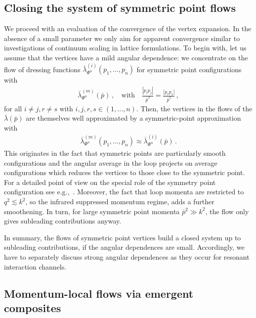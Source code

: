 \documentclass[aps,twocolumn,prd,superscriptaddress]{revtex4-2}
\begin{document}
\subsection{Closing the system of symmetric point flows} 
\label{sec:SymPointflows}
 
We proceed with an evaluation of the convergence of the vertex expansion. In the absence of a small parameter we only aim for apparent convergence similar to investigations of continuum scaling in lattice formulations. 
To begin with, let us assume that the vertices have a mild angular dependence: we concentrate on the flow of dressing functions $\bar\lambda_{\Phi^n}^{(i)}(p_1,...,p_n)$ for symmetric point configurations with 
%
\begin{align} \label{eq:SymPoint}
	\bar \lambda_{\Phi^n}^{(m)}(\bar p)\,,\quad \textrm{with}\quad \frac{|p_i p_j|}{\bar p^2} = \frac{|p_r p_s |}{\bar p^2} \,,
\end{align}
%
for all $i\neq j,r\neq s$ with $i,j,r,s\in(1,...,n)$. 
Then, the vertices in the flows of the $\bar \lambda(\bar p)$ are themselves well approximated by a symmetric-point approximation with 
%
\begin{align} 
\bar \lambda_{\Phi^n}^{(m)}(p_1,...,p_n) \approx \bar \lambda_{\Phi^n}^{(i)}(\bar p)\,. 
\end{align}
%
This originates in the fact that symmetric points are particularly smooth configurations and the angular average in the loop projects on average configurations which reduces the vertices to those close to the symmetric point. For a detailed point of view on the special role of the symmetry point configuration see e.g.,~\cite{Eichmann:2014xya, Eichmann:2015nra}. Moreover, the fact that loop momenta are restricted to $q^2\lesssim k^2$, so the infrared suppressed momentum regime, adds a further smoothening. In turn, for large symmetric point momenta $\bar p^2\gg k^2$, the flow only gives subleading contributions anyway. 

In summary, the flows of symmetric point vertices build a closed system up to subleading contributions, if the angular dependences are small. Accordingly, we have to separately discuss strong angular dependences as they occur for resonant interaction channels.


\subsection{Momentum-local flows via emergent composites}
\label{sec:ResonantChannels}
\end{document}

